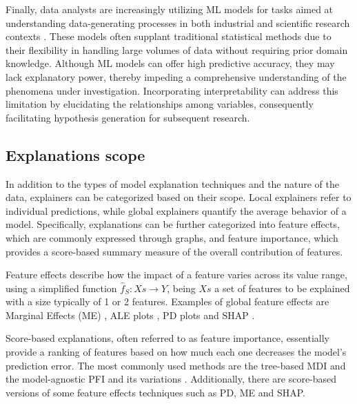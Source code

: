 Finally, data analysts are increasingly utilizing ML models for tasks aimed at understanding data-generating processes in both industrial and scientific research contexts \cite{Freiesleben2022ScientificPhenomena, SilvaFilho2023AAchievement}. These models often supplant traditional statistical methods due to their flexibility in handling large volumes of data without requiring prior domain knowledge. Although ML models can offer high predictive accuracy, they may lack explanatory power, thereby impeding a comprehensive understanding of the phenomena under investigation. Incorporating interpretability can address this limitation by elucidating the relationships among variables, consequently facilitating hypothesis generation for subsequent research.

\subsection{Explanations scope}

In addition to the types of model explanation techniques and the nature of the data, explainers can be categorized based on their scope. Local explainers refer to individual predictions, while global explainers quantify the average behavior of a model. Specifically, explanations can be further categorized into feature effects, which are commonly expressed through graphs, and feature importance, which provides a score-based summary measure of the overall contribution of features.

Feature effects describe how the impact of a feature varies across its value range, using a simplified function $\hat{f}_S: Xs \xrightarrow{} Y$, being $Xs$ a set of features to be explained with a size typically of 1 or 2 features. Examples of global feature effects are Marginal Effects (ME) \cite{Long2021UsingOutcomes, Mize2019AModels}, ALE plots \cite{Apley2020VisualizingModels}, PD plots \cite{Friedman2001GreedyMachine.} and SHAP \cite{10.5555/3295222.3295230}. 

Score-based explanations, often referred to as feature importance, essentially provide a ranking of features based on how much each one decreases the model's prediction error. The most commonly used methods are the tree-based MDI \cite{Breiman2001RandomForests} and the model-agnostic PFI \cite{Fisher2018AllSimultaneously} and its variations \cite{Molnar2023Model-agnosticApproach, Strobl2008ConditionalForests}. Additionally, there are score-based versions of some feature effects techniques such as PD\cite{Greenwell2018AMeasure}, ME\cite{long1997regression} and SHAP\cite{Lee2023SHAPForecasting}.

